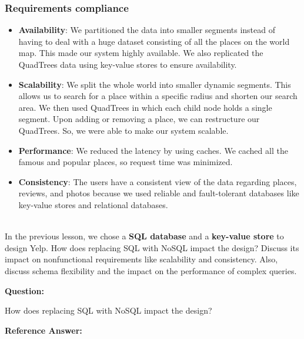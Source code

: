 \subsubsection{Requirements compliance}\label{XkNq1G1trTzQgo3eIFsUx}

\begin{itemize}
\item
\protect{}\label{QibnD39uFfVphMRbAeTK9}
\textbf{Availability}: We partitioned the data into smaller segments instead of having to deal with a huge dataset consisting of all the places on the world map. This made our system highly available. We also replicated the QuadTrees data using key-value stores to ensure availability.
\item
\protect{}\label{w1pX73MragO7QSzo-YAD7}
\textbf{Scalability}: We split the whole world into smaller dynamic segments. This allows us to search for a place within a specific radius and shorten our search area. We then used QuadTrees in which each child node holds a single segment. Upon adding or removing a place, we can restructure our QuadTrees. So, we were able to make our system scalable.
\item
\protect{}\label{FKFzQ13xLnVoCa15PiE5h}
\textbf{Performance}: We reduced the latency by using caches. We cached all the famous and popular places, so request time was minimized.
\item
\protect{}\label{hyu2CtvkM3N4rknZuS-ME}
\textbf{Consistency}: The users have a consistent view of the data regarding places, reviews, and photos because we used reliable and fault-tolerant databases like key-value stores and relational databases.
\end{itemize}
\\
In the previous lesson, we chose a \textbf{SQL database} and a \textbf{key-value store} to design Yelp. How does replacing SQL with NoSQL impact the design? Discuss its impact on nonfunctional requirements like scalability and consistency. Also, discuss schema flexibility and the impact on the performance of complex queries.

\textbf{Question:}

How does replacing SQL with NoSQL impact the design?

\textbf{Reference Answer:}

